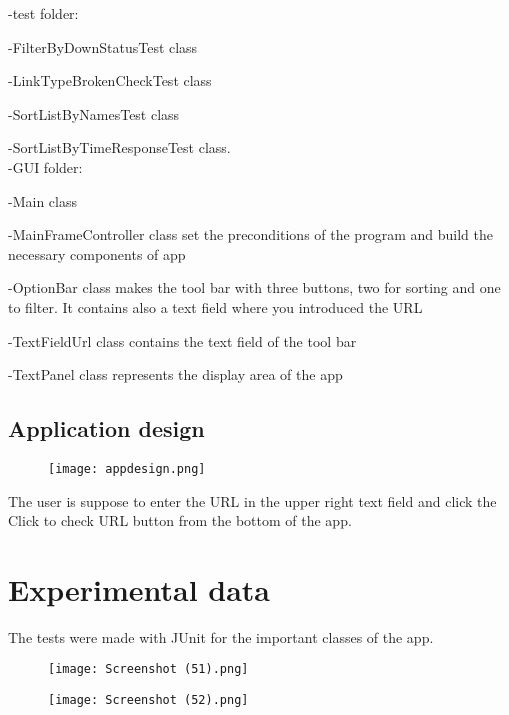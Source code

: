 \documentclass[11pt,leqno]{article}
\begin{document}
-test folder:\par
-FilterByDownStatusTest class\par 
-LinkTypeBrokenCheckTest class\par 
-SortListByNamesTest class\par 
-SortListByTimeResponseTest class.\\
-GUI folder:\par
-Main class\par
-MainFrameController class set the preconditions of the program and build the necessary components of app\par
-OptionBar class makes the tool bar with three buttons, two for sorting and one to filter. It contains also a text field where you introduced the URL\par
-TextFieldUrl class contains the text field of the tool bar\par
-TextPanel class represents the display area of the app\\

\vspace{10mm}
\subsection{Application design}

\begin{figure}[htp]
    \centering
    \texttt{[image: appdesign.png]}
\end{figure}

The user is suppose to enter the URL in the upper right text field and click the Click to check URL button from the bottom of the app.
\newpage

\section{Experimental data}
The tests were made with JUnit for the important classes of the app.\\

\vspace{10mm}

\begin{figure}[htp]
    \centering
    \texttt{[image: Screenshot (51).png]}
\end{figure}

\begin{figure}[htp]
    \centering
    \texttt{[image: Screenshot (52).png]}
\end{figure}
\end{document}
